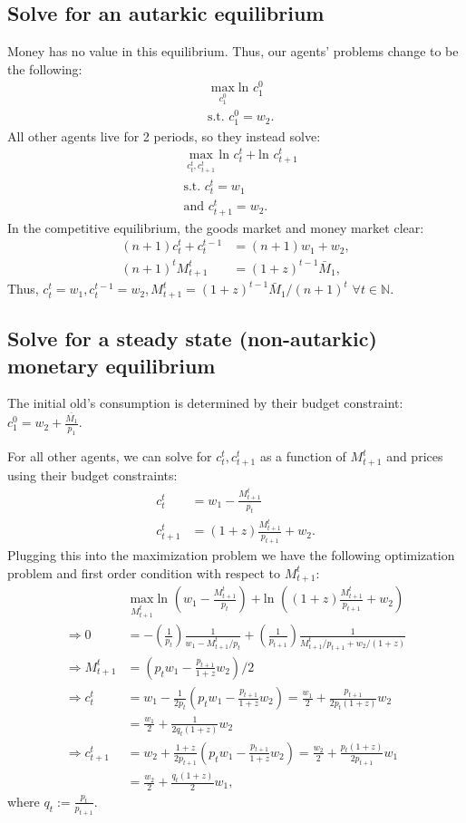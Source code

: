 \documentclass[11pt]{article} %
\begin{document}
\subsection{Solve for an autarkic equilibrium}
Money has no value in this equilibrium. Thus, our agents' problems change to be the following:
\begin{align*}
&\max_{c_1^0} \text{ln } c_1^0 \\
&\text{s.t. } c_1^0 = w_2 .
\end{align*}
All other agents live for 2 periods, so they instead solve:
\begin{align*}
&\max_{c_t^t,c_{t+1}^t} \text{ln } c_t^t + \text{ln } c_{t+1}^t \\
&\text{s.t. } c_t^t = w_1 \\
&\text{and } c_{t+1}^t = w_2.
\end{align*}
In the competitive equilibrium, the goods market and money market clear:
\begin{align*}
(n+1)c_t^t +c_t^{t-1} &= (n+1)w_1 + w_2, \\
(n+1)^t M_{t+1}^t  &= (1+z)^{t-1}\bar{M}_1,
\end{align*}
Thus, $c_t^t = w_1, c_t^{t-1} = w_2, M_{t+1}^t = (1+z)^{t-1}\bar{M}_1/(n+1)^t $ $\forall t \in \mathbb{N}.$
\subsection{Solve for a steady state (non-autarkic) monetary equilibrium}
The initial old's consumption is determined by their budget constraint: $c_1^0 = w_2 + \frac{\bar{M_1}}{p_1}$.

For all other agents, we can solve for $c_t^t,c_{t+1}^{t}$ as a function of $M_{t+1}^t$ and prices using their budget constraints:
\begin{align*}
c_t^t &= w_1 - \frac{M_{t+1}^t}{p_t}\\
c_{t+1}^t &= (1+z)\frac{M^t_{t+1}}{p_{t+1}} + w_2.
\end{align*}
Plugging this into the maximization problem we have the following optimization problem and first order condition with respect to $M^t_{t+1}:$
\begin{align*}
&\max_{M_{t+1}^t} \text{ln } \left(w_1 - \frac{M_{t+1}^t}{p_t}\right) + \text{ln } \left((1+z)\frac{M^t_{t+1}}{p_{t+1}} + w_2\right) \\
\Rightarrow 0 &=  -\left(\frac{1}{p_t}\right)\frac{1}{w_1 - M^t_{t+1}/p_t} +\left(\frac{1}{p_{t+1}}\right) \frac{1}{M^t_{t+1}/p_{t+1} + w_2/(1+z)} \\
\Rightarrow M^t_{t+1} &= \left( p_tw_1 - \frac{p_{t+1}}{1+z}w_2\right)/2\\
\Rightarrow c_t^t &= w_1 - \frac{1}{2p_t}\left(  p_tw_1 - \frac{p_{t+1}}{1+z}w_2\right) = \frac{w_1}{2} + \frac{p_{t+1}}{2p_t(1+z)}w_2 \\
&= \frac{w_1}{2} + \frac{1}{2q_t(1+z)}w_2 \\
\Rightarrow c_{t+1}^t &= w_2 + \frac{1+z}{2p_{t+1}}\left(  p_tw_1 - \frac{p_{t+1}}{1+z}w_2\right) = \frac{w_2}{2} + \frac{p_t(1+z)}{2p_{t+1}}w_1 \\
&= \frac{w_2}{2} + \frac{q_t(1+z)}{2}w_1 ,
\end{align*}
where $q_t:= \frac{p_t}{p_{t+1}}$.
\end{document}
